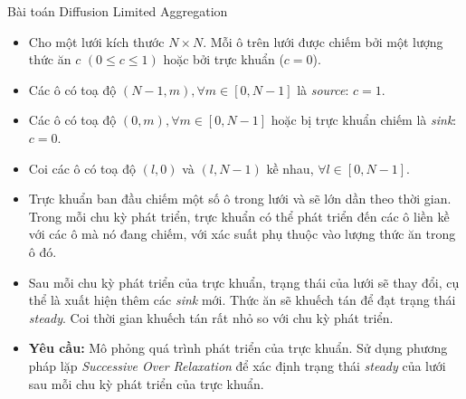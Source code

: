 \begin{frame}[allowframebreaks]{Bài toán Diffusion Limited Aggregation}
\begin{itemize}
	\item Cho một lưới kích thước $N \times N$. Mỗi ô trên lưới được chiếm bởi một lượng thức ăn $c$ $(0 \leq c \leq 1)$ hoặc bởi trực khuẩn ($c = 0$).
	\item Các ô có toạ độ $(N - 1, m), \forall m \in [0, N - 1]$ là \emph{source}: $c = 1$.
	\item Các ô có toạ độ $(0, m), \forall m \in [0, N - 1]$ hoặc bị trực khuẩn chiếm là \emph{sink}: $c = 0$.
	\item Coi các ô có toạ độ $(l, 0)$ và $(l, N - 1)$ kề nhau, $\forall l \in [0, N - 1]$.
	\item Trực khuẩn ban đầu chiếm một số ô trong lưới và sẽ lớn dần theo thời gian. Trong mỗi chu kỳ phát triển, trực khuẩn có thể phát triển đến các ô liền kề với các ô mà nó đang chiếm, với xác suất phụ thuộc vào lượng thức ăn trong ô đó.
	\item Sau mỗi chu kỳ phát triển của trực khuẩn, trạng thái của lưới sẽ thay đổi, cụ thể là xuất hiện thêm các \emph{sink} mới. Thức ăn sẽ khuếch tán để đạt trạng thái \emph{steady}. Coi thời gian khuếch tán rất nhỏ so với chu kỳ phát triển.
	\item \textbf{Yêu cầu:} Mô phỏng quá trình phát triển của trực khuẩn. Sử dụng phương pháp lặp \emph{Successive Over Relaxation} để xác định trạng thái \emph{steady} của lưới sau mỗi chu kỳ phát triển của trực khuẩn. 
\end{itemize}
\end{frame}